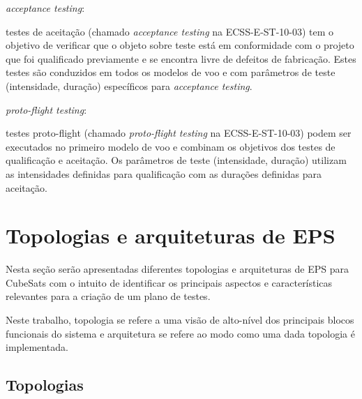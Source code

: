 \begin{alineas}
    \item \textit{acceptance testing}:
    \begin{alineas}
        \item testes de aceitação (chamado \textit{acceptance testing} na ECSS-E-ST-10-03) tem o objetivo de verificar que o objeto sobre teste está em conformidade com o projeto que foi qualificado previamente e se encontra livre de defeitos de fabricação. Estes testes são conduzidos em todos os modelos de voo e com parâmetros de teste (intensidade, duração) específicos para \textit{acceptance testing}.
    \end{alineas}

    \item \textit{proto-flight testing}:
    \begin{alineas}
        \item testes proto-flight (chamado \textit{proto-flight testing} na ECSS-E-ST-10-03) podem ser executados no primeiro modelo de voo e combinam os objetivos dos testes de qualificação e aceitação. Os parâmetros de teste (intensidade, duração) utilizam as intensidades definidas para qualificação com as durações definidas para aceitação.
    \end{alineas}
\end{alineas}



\section{Topologias e arquiteturas de EPS}\label{sec:arq-top}

Nesta seção serão apresentadas diferentes topologias e arquiteturas de \gls{EPS} para CubeSats com o intuito de identificar os principais aspectos e características relevantes para a criação de um plano de testes.

Neste trabalho, topologia se refere a uma visão de alto-nível dos principais blocos funcionais do sistema e arquitetura se refere ao modo como uma dada topologia é implementada.

\subsection{Topologias}\label{sec:topologias}

